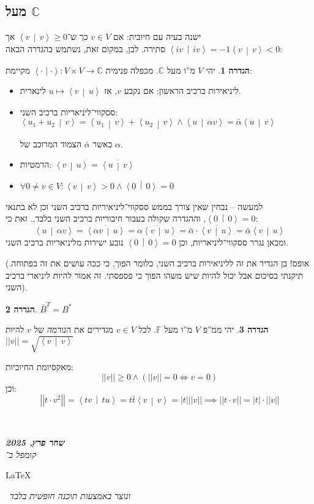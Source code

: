 \documentclass[]{article}
\newcommand\en[1] {\begin{otherlanguage}{english}#1\end{otherlanguage}}
\newcommand\ndoc  {\dotfill \\ \vfil {\begin{center}
            {\textbf{\textit{שחר פרץ, 2025}} \\
                \scriptsize \textit{קומפל ב־}\en{\LaTeX}\,\textit{ ונוצר באמצעות תוכנה חופשית בלבד}}
    \end{center}} \vfil	}
\newcommand\C     {\mathbb{C}}
\newcommand\ra    {\rangle}
\newcommand\la    {\langle}
\newcommand\ol    {\overline}
\newcommand\F         {\mathbb{F}}
\newcommand\co        {\colon}
\newcommand\norm[1]   {\left \vert \left \vert #1 \right \vert \right \vert}
\newcommand\ag        {\alpha}
\newcommand\sof[1]    {\left | #1 \right |}
\newcommand\mut[2]    {\left \la #1 \,\middle\vert\, #2 \right \ra}
\newcommand\smut      {\left \la \cdot \mid \cdot \right \ra}
\theoremstyle{definition}
\newtheorem{definition}{הגדרה}
\newcommand\defi  [1] {\begin{definition}#1\end{definition}}
\begin{document}
    \subsection{מעל $\C$}
    ישנה בעיה עם חיובית: אם $v \in V$ כך ש־$\mut{v}{v} \ge 0$ אך $\mut{iv}{iv} = -1\mut{v}{v} < 0$ סתירה. לכן, במקום זאת, נשתמש בהגדרה הבאה: 
    \defi{יהי $V$ מ''ו מעל $\C$. מכפלה פנימית $\smut \co V \times V \to \C$ מקיימת: 
    \begin{itemize}
        \item ליניאירות ברכיב הראשון: אם נקבע $v$, אז $u \mapsto \mut{v}{u}$ לינארית. 
        \item ססקווי־ליניאריות ברכיב השני: \hfill $\mut{u_1 + u_2}{v} = \mut{u_1}{v} + \mut{u_2}{v} \land \mut{u}{\ag v} = \bar \ag \mut{u}{v}$ 
        
        כאשר $\bar \ag$ הצמוד המרוכב של $\ag$. 
        \item הרמטיות: \hfill $\mut{v}{u} = \ol{\mut{u}{v}}$
        \item \hfil $\forall 0 \neq v \in V \co \mut{v}{v} > 0 \land \mut{0}{0} = 0$
    \end{itemize}}
    למעשה – נבחין שאין צורך בממש ססקווי־ליניאיריות ברכיב השני וכן לא בתנאי $\mut{0}{0} = 0$, וההגדרה שקולה בעבור חיבוריות ברכיב השני בלבד,. זאת כי: 
    \[ \mut{u}{\ag v} = \ol{\mut{\ag v}{u}} = \ol{\ag \mut{v}{u}} = \bar \ag \cdot \ol{\mut{v}{u}} = \bar \ag \mut{v}{u} \]
    ומכאן נגרר ססקווי־ליניאריות, וכן $\mut{0}{0} = 0$ נובע ישירות מליניאריות ברכיב השני. 
    
    (אופס! בן הגדיר את זה לליניאירות ברכיב השני, כלומר הפוך, כי ככה עושים את זה בפתוחה. תיקנתי בסיכום אבל יכול להיות שיש משהו הפוך כי פספסתי. זה אמור להיות ליניארי ברכיב השני).
    
    \defi{\hfil $\bar B^T = B^*$}
    
    \defi{יהי ממ''פ $V$ מ''ו מעל $\F$. לכל $v \in V$ מגדירים את ה\textit{נורמה} של $v$ להיות $ \norm{v} = \sqrt{\mut{v}{v}} $}
    
    מאקסיומת החיוביות: 
    \[ \norm{v} \ge 0 \land (\norm{v} = 0 \iff v = 0) \]
    וכן: 
    \[ \norm{t \cdot v^2} = \mut{tv}{tu} = t \bar t\mut{v}{v} = \sof{t}\norm{v} \implies \norm{t \cdot v} = \sof{t} \cdot \norm{v} \]
    
    
    
    
    
    
    
    \ndoc
\end{document}
